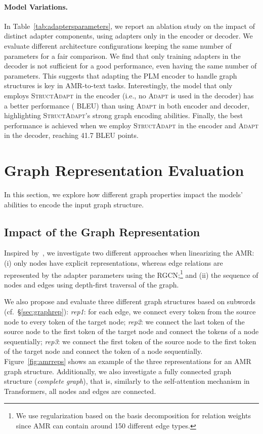 \documentclass[11pt]{article}
\newcommand{\graphadapter}{{\small\textsc{StructAdapt}}\xspace}
\newcommand{\vanilladapter}{{\small\textsc{Adapt}}\xspace}
\begin{document}
\paragraph{Model Variations.}

In Table~\ref{tab:adaptersparameters}, we report an ablation study on the impact of distinct adapter components, using adapters only in the encoder or decoder. We evaluate different architecture configurations keeping the same number of parameters for a fair comparison. We find that only training adapters in the decoder is not sufficient for a good performance, even having the same number of parameters. This suggests that adapting the PLM encoder to handle graph structures is key in AMR-to-text tasks. Interestingly, the model that only employs \graphadapter in the encoder (i.e., no \vanilladapter is used in the decoder) has a better performance ( BLEU) than using \vanilladapter in both encoder and decoder, highlighting \graphadapter's strong graph encoding abilities. Finally, the best performance is achieved when we employ \graphadapter in the encoder and \vanilladapter in the decoder, reaching 41.7 BLEU points.

\section{Graph Representation Evaluation}
\label{sec:graphrepeval}

In this section, we explore how different graph properties impact the models' abilities to encode the input graph structure.

\subsection{Impact of the Graph Representation}
\label{sec:amrinputrep}
 Inspired by~\citet{damonte-cohen-2019-structural}, we investigate two different approaches when linearizing the AMR: (i) only nodes have explicit representations, whereas edge relations are represented by the adapter parameters using the RGCN;\footnote{We use regularization based on the basis decomposition for relation weights \cite{Schlichtkrull2018ModelingRD} since AMR can contain around 150 different edge types.} and (ii) the sequence of nodes and edges using depth-first traversal of the graph. 
 
 We also propose and evaluate three different graph structures based on subwords (cf.\ \S\ref{sec:graphrep}): \emph{rep1}: for each edge, we connect every token from the source node to every token of the target node; \emph{rep2}: we connect the last token of the source node to the first token of the target node and connect the tokens of a node sequentially; \emph{rep3}: we connect the first token of the source node to the first token of the target node and connect the token of a node sequentially. Figure~\ref{fig:amrreps} shows an example of the three representations for an AMR graph structure. Additionally, we also investigate a fully connected graph structure (\emph{complete graph}), that is, similarly to the self-attention mechanism in Transformers, all nodes and edges are connected.
 
\end{document}
